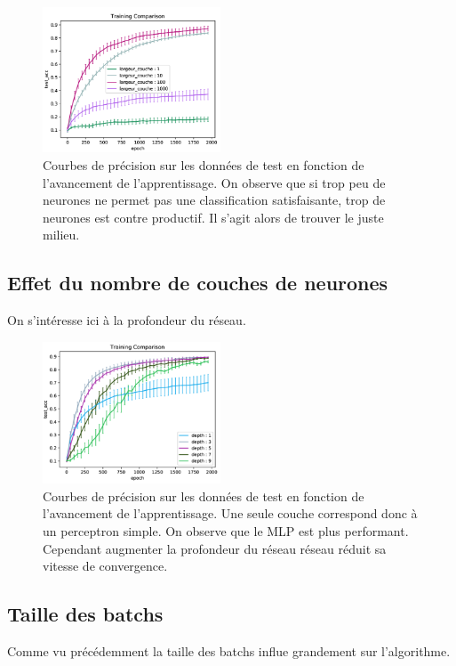 \begin{figure}[!h]
\centering
\includegraphics[width=150pt]{"images/MLP/MLP_largeur"}
\caption{Courbes de précision sur les données de test en fonction de l'avancement de l'apprentissage. On observe que si trop peu de neurones ne permet pas une classification satisfaisante,  trop de neurones est contre productif. Il s'agit alors de trouver le juste milieu.\\ }
\label{MLP_largeur}
\end{figure}

\subsection{Effet du nombre de couches de neurones}
On s'intéresse ici à la profondeur du réseau.
\begin{figure}[!h]
\centering
\includegraphics[width=150pt]{"images/MLP/MLP_profondeur"}
\caption{Courbes de précision sur les données de test en fonction de l'avancement de l'apprentissage. Une seule couche correspond donc à un perceptron simple. On observe que le MLP est plus performant. Cependant augmenter la profondeur du réseau réseau réduit sa vitesse de convergence.\\ }
\label{MLP_profondeur}
\end{figure}

\subsection{Taille des batchs}
Comme vu précédemment la taille des batchs influe grandement sur l'algorithme.

